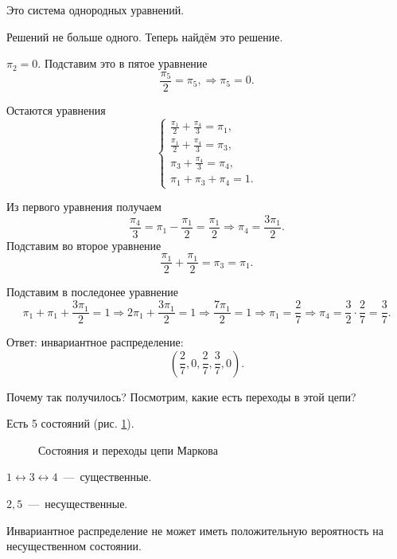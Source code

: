 Это система однородных уравнений.

Решений не больше одного.
Теперь найдём это решение.

$ \pi_2 = 0$.
Подставим это в пятое уравнение
\begin{equation*}
  \frac{ \pi_5}{2} = \pi_5, \Rightarrow
  \pi_5 = 0.
\end{equation*}

Остаются уравнения
\begin{equation*}
  \begin{cases}
    \frac{ \pi_1}{2} + \frac{ \pi_4}{3} = \pi_1, \\
    \frac{ \pi_1}{2} + \frac{ \pi_4}{3} = \pi_3, \\
    \pi_3 + \frac{\pi_4}{3} = \pi_4, \\
    \pi_1 + \pi_3 + \pi_4 = 1.
  \end{cases}
\end{equation*}

Из первого уравнения получаем
\begin{equation*}
  \frac{ \pi_4}{3} = \pi_1 - \frac{ \pi_1}{2} = \frac{ \pi_1}{2} \Rightarrow
  \pi_4 = \frac{3 \pi_1}{2}.
\end{equation*}
Подставим во второе уравнение
\begin{equation*}
  \frac{ \pi_1}{2} + \frac{ \pi_1}{2} =
  \pi_3 = \pi_1.
\end{equation*}

Подставим в последонее уравнение
\begin{equation*}
  \pi_1 + \pi_1 + \frac{3 \pi_1}{2} = 1 \Rightarrow
  2 \pi_1 + \frac{3 \pi_1}{2} = 1 \Rightarrow
  \frac{7 \pi_1}{2} = 1 \Rightarrow
  \pi_1 = \frac{2}{7} \Rightarrow
  \pi_4 = \frac{3}{2} \cdot \frac{2}{7} = \frac{3}{7}.
\end{equation*}

Ответ: инвариантное распределение:
\begin{equation*}
  \left( \frac{2}{7}, 0, \frac{2}{7}, \frac{3}{7}, 0 \right).
\end{equation*}

Почему так получилось?
Посмотрим, какие есть переходы в этой цепи?

Есть 5 состояний (рис. \ref{fig:1512}).

\begin{figure}[h]
  \centering
  
  \caption{Состояния и переходы цепи Маркова}
  \label{fig:1512}
\end{figure}

$1 \leftrightarrow 3 \leftrightarrow 4$~---~существенные.

$2, 5$~---~несущественные.

Инвариантное распределение не может иметь положительную вероятность на несущественном состоянии.
